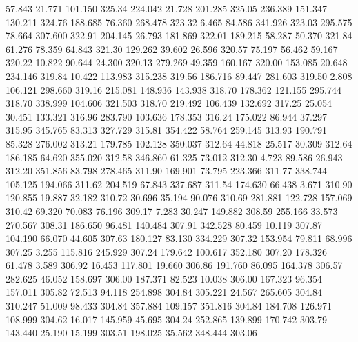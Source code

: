   57.843   21.771  101.150       325.34
 224.042   21.728  201.285       325.05
 236.389  151.347  130.211       324.76
 188.685   76.360  268.478       323.32
   6.465   84.586  341.926       323.03
 295.575   78.664  307.600       322.91
 204.145   26.793  181.869       322.01
 189.215   58.287   50.370       321.84
  61.276   78.359   64.843       321.30
 129.262   39.602   26.596       320.57
  75.197   56.462   59.167       320.22
  10.822   90.644   24.300       320.13
 279.269   49.359  160.167       320.00
 153.085   20.648  234.146       319.84
  10.422  113.983  315.238       319.56
 186.716   89.447  281.603       319.50
   2.808  106.121  298.660       319.16
 215.081  148.936  143.938       318.70
 178.362  121.155  295.744       318.70
 338.999  104.606  321.503       318.70
 219.492  106.439  132.692       317.25
  25.054   30.451  133.321       316.96
 283.790  103.636  178.353       316.24
 175.022   86.944   37.297       315.95
 345.765   83.313  327.729       315.81
 354.422   58.764  259.145       313.93
 190.791   85.328  276.002       313.21
 179.785  102.128  350.037       312.64
  44.818   25.517   30.309       312.64
 186.185   64.620  355.020       312.58
 346.860   61.325   73.012       312.30
   4.723   89.586   26.943       312.20
 351.856   83.798  278.465       311.90
 169.901   73.795  223.366       311.77
 338.744  105.125  194.066       311.62
 204.519   67.843  337.687       311.54
 174.630   66.438    3.671       310.90
 120.855   19.887   32.182       310.72
  30.696   35.194   90.076       310.69
 281.881  122.728  157.069       310.42
  69.320   70.083   76.196       309.17
   7.283   30.247  149.882       308.59
 255.166   33.573  270.567       308.31
 186.650   96.481  140.484       307.91
 342.528   80.459   10.119       307.87
 104.190   66.070   44.605       307.63
 180.127   83.130  334.229       307.32
 153.954   79.811   68.996       307.25
   3.255  115.816  245.929       307.24
 179.642  100.617  352.180       307.20
 178.326   61.478    3.589       306.92
  16.453  117.801   19.660       306.86
 191.760   86.095  164.378       306.57
 282.625   46.052  158.697       306.00
 187.371   82.523   10.038       306.00
 167.323   96.354  157.011       305.82
  72.513   94.118  254.898       304.84
 305.221   24.567  265.605       304.84
 310.247   51.009   98.433       304.84
 357.884  109.157  351.816       304.84
 184.708  126.971  108.999       304.62
  16.017  145.959   45.695       304.24
 252.865  139.899  170.742       303.79
 143.440   25.190   15.199       303.51
 198.025   35.562  348.444       303.06
